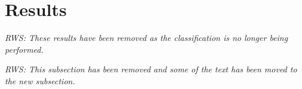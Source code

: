 \documentclass{ametsoc}
\begin{document}
\section{Results}

\emph{RWS: These results have been removed as the classification is no longer being performed.}

\emph{RWS: This subsection has been removed and some of the text has been moved to the new subsection.}
\end{document}
